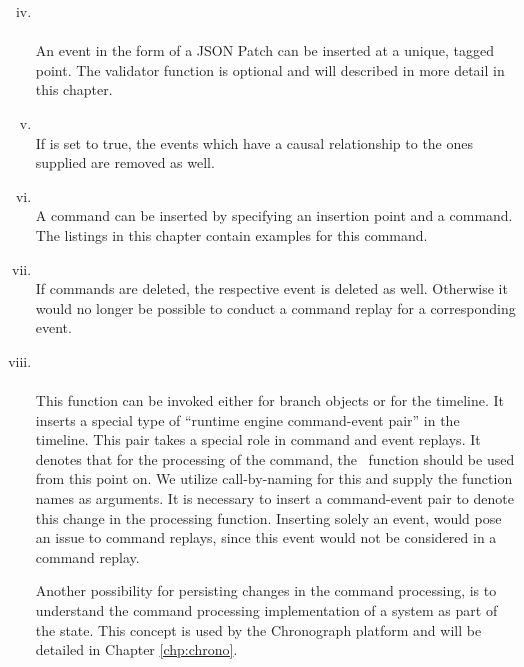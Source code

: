 \begin{enumerate}[(i)] 
\setcounter{enumi}{3}
	\item {}\\
	\\
	An event in the form of a JSON Patch can be inserted at a unique, tagged point.
	The validator function  is optional and will
	described in more detail in this chapter.

	\item {}\\
	If  is set to true, the events which have a
	causal relationship to the ones supplied are removed as well.

	\item {}\\
	A command can be inserted by specifying an insertion point and a command. 
	The listings in this chapter contain examples for this command.

	\item {}\\
	If commands are deleted, the respective event is deleted as well.
	Otherwise it would no longer be possible to conduct a command replay
	for a corresponding event.

	\item 
	\\
	\\
	This function can be invoked either for branch objects or for the timeline. 
	It inserts a special type of ``runtime engine command-event pair'' in the
	timeline. This pair takes a special role in command and event replays. 
	It denotes that for the processing of the  command, the \, 
	function should be used from this point on.
	We utilize call-by-naming for this and supply the function names as arguments. 
	It is necessary to insert a command-event pair to denote this change in the 
	processing function. Inserting solely an event, would pose an issue to command 
	replays, since this event would not be considered in a command replay.

	Another possibility for persisting changes in the command processing, is to 
	understand the command processing implementation of a system as part of the 
	state. This concept is used by the Chronograph platform and will be detailed 
	in Chapter \ref{chp:chrono}.
\end{enumerate}

